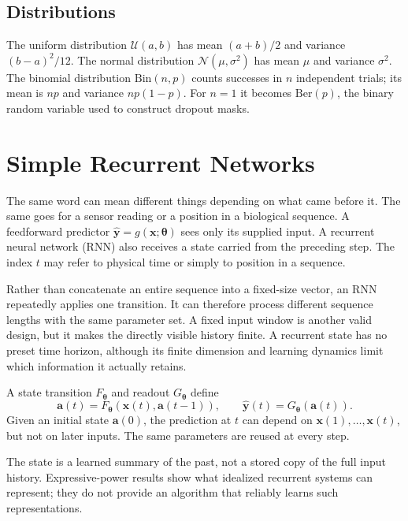 \documentclass[11pt, oneside]{book}
\newcommand{\params}{\boldsymbol{\theta}}   %
\newcommand{\Normal}{\mathcal{N}}
\newcommand{\Uniform}{\mathcal{U}}
\newcommand{\Bernoulli}{\mathrm{Ber}}
\newcommand{\Binomial}{\mathrm{Bin}}
\let\originalsection\section
\renewcommand{\section}{\Needspace{7\baselineskip}\originalsection}
\begin{document}
\section{Distributions}\label{sec:source-0-11}
The uniform distribution $\Uniform(a,b)$ has mean $(a+b)/2$ and variance $(b-a)^2/12$. The normal distribution $\Normal(\mu,\sigma^2)$ has mean $\mu$ and variance $\sigma^2$. The binomial distribution $\Binomial(n,p)$ counts successes in $n$ independent trials; its mean is $np$ and variance $np(1-p)$. For $n=1$ it becomes $\Bernoulli(p)$, the binary random variable used to construct dropout masks.

\chapter{Simple Recurrent Networks}\label{ch:source-1}

The same word can mean different things depending on what came before it. The same goes for a sensor reading or a position in a biological sequence. A feedforward predictor $\widehat{\mathbf{y}}=g(\mathbf{x};\params)$ sees only its supplied input. A recurrent neural network (RNN) also receives a state carried from the preceding step. The index $t$ may refer to physical time or simply to position in a sequence.

Rather than concatenate an entire sequence into a fixed-size vector, an RNN repeatedly applies one transition. It can therefore process different sequence lengths with the same parameter set. A fixed input window is another valid design, but it makes the directly visible history finite. A recurrent state has no preset time horizon, although its finite dimension and learning dynamics limit which information it actually retains.

\begin{defbox}[title={A causal recurrent sequence model}]
A state transition $F_{\params}$ and readout $G_{\params}$ define
\[
 \mathbf{a}(t)=F_{\params}(\mathbf{x}(t),\mathbf{a}(t-1)),\qquad
 \widehat{\mathbf{y}}(t)=G_{\params}(\mathbf{a}(t)).
\]
Given an initial state $\mathbf{a}(0)$, the prediction at $t$ can depend on $\mathbf{x}(1),\ldots,\mathbf{x}(t)$, but not on later inputs. The same parameters are reused at every step.
\end{defbox}

The state is a learned summary of the past, not a stored copy of the full input history. Expressive-power results show what idealized recurrent systems can represent; they do not provide an algorithm that reliably learns such representations.
\end{document}

